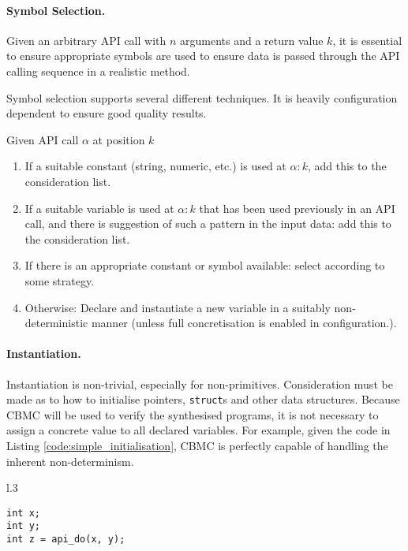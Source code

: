 \documentclass[EPiCempty]{easychair}
\begin{document}
\paragraph{Symbol Selection.}
Given an arbitrary API call with $n$ arguments and a return value $k$, it is essential to ensure appropriate symbols are used to ensure data is passed through the API calling sequence in a realistic method.

Symbol selection supports several different techniques. It is heavily configuration dependent to ensure good quality results.

Given API call $\alpha$ at position $k$

\begin{enumerate}[label=(\alph*)]
	\item If a suitable constant (string, numeric, etc.) is used at $\alpha:k$, add this to the consideration list.
	\item If a suitable variable is used at $\alpha:k$ that has been used previously in an API call, and there is suggestion of such a pattern in the input data: add this to the consideration list.
	\item If there is an appropriate constant or symbol available: select according to some strategy.
	\item Otherwise: Declare and instantiate a new variable in a suitably non-deterministic manner (unless full concretisation is enabled in configuration.).
\end{enumerate}

\paragraph{Instantiation.}
Instantiation is non-trivial, especially for non-primitives.  Consideration must be made as to how to initialise pointers, \texttt{struct}s and other data structures.  Because CBMC will be used to verify the synthesised programs, it is not necessary to assign a concrete value to all declared variables.  For example, given the code in Listing \ref{code:simple_initialisation}, CBMC is perfectly capable of handling the inherent non-determinism.  


\begin{wrapfigure}[7]{l}{.3\textwidth}
\begin{lstlisting}[caption={A simple, valid calling sequence}, numbers=none, label={code:simple_initialisation}]
int x;
int y;
int z = api_do(x, y);
\end{lstlisting}
\end{wrapfigure}
\end{document}
